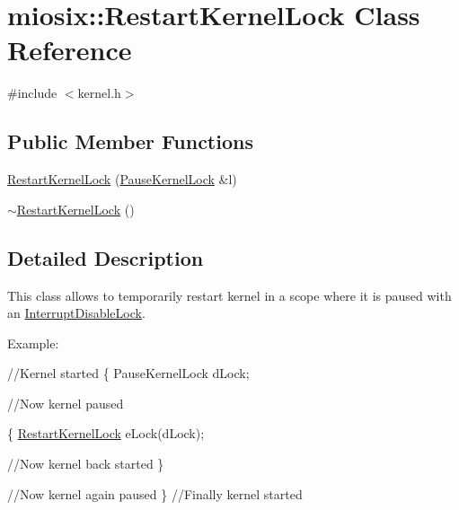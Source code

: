 \hypertarget{classmiosix_1_1_restart_kernel_lock}{\section{miosix\-:\-:Restart\-Kernel\-Lock Class Reference}
\label{classmiosix_1_1_restart_kernel_lock}
}


{\ttfamily \#include $<$kernel.\-h$>$}

\subsection*{Public Member Functions}
\begin{DoxyCompactItemize}
\item 
\hyperlink{classmiosix_1_1_restart_kernel_lock_a56fdd23f84789f624cf85cd3ff54d045}{Restart\-Kernel\-Lock} (\hyperlink{classmiosix_1_1_pause_kernel_lock}{Pause\-Kernel\-Lock} \&l)
\item 
\hyperlink{classmiosix_1_1_restart_kernel_lock_ac026033adfae754118e6025ad7ce01bb}{$\sim$\-Restart\-Kernel\-Lock} ()
\end{DoxyCompactItemize}


\subsection{Detailed Description}
This class allows to temporarily restart kernel in a scope where it is paused with an \hyperlink{classmiosix_1_1_interrupt_disable_lock}{Interrupt\-Disable\-Lock}.\par
 Example\-: 
\begin{DoxyCode}
\textcolor{comment}{//Kernel started}
\{
    PauseKernelLock dLock;

    \textcolor{comment}{//Now kernel paused}

    \{
        \hyperlink{classmiosix_1_1_restart_kernel_lock_a56fdd23f84789f624cf85cd3ff54d045}{RestartKernelLock} eLock(dLock);

        \textcolor{comment}{//Now kernel back started}
    \}

    \textcolor{comment}{//Now kernel again paused}
\}
\textcolor{comment}{//Finally kernel started}
\end{DoxyCode}
 

